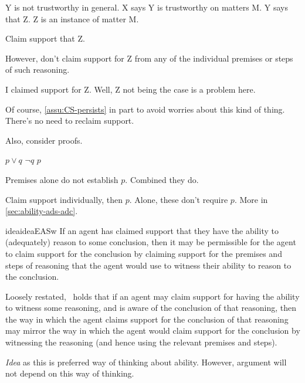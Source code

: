 \begin{note}
  Y is not trustworthy in general.
  X says Y is trustworthy on matters M.
  Y says that Z.
  Z is an instance of matter M.

  Claim support that Z.

  However, don't claim support for Z from any of the individual premises or steps of such reasoning.

  I claimed support for Z.
  Well, Z not being the case is a problem here.

  Of course, \ref{assu:CS-persists} in part to avoid worries about this kind of thing.
  There's no need to reclaim support.

  Also, consider proofs.

  \(p \lor q\)
  \(\lnot q\)
  \(p\)

  Premises alone do not establish \(p\).
  Combined they do.

  Claim support individually, then \(p\).
  Alone, these don't require \(p\).
  More in \autoref{sec:ability-ads-adc}.
\end{note}

\begin{note}[\EASw{}]
    \begin{restatable}[\EASw{-} --- \EASw{}]{idea}{ideaEASw}\label{prop:EASw}
    If an agent has claimed support that they have the ability to (adequately) reason to some conclusion, then it may be permissible for the agent to claim support for the conclusion by claiming support for the premises and steps of reasoning that the agent would use to witness their ability to reason to the conclusion.
  \end{restatable}

  Loosely restated,~\EASw{} holds that if an agent may claim support for having the ability to witness some reasoning, and is aware of the conclusion of that reasoning, then the way in which the agent claims support for the conclusion of that reasoning may mirror the way in which the agent would claim support for the conclusion by witnessing the reasoning (and hence using the relevant premises and steps).
\end{note}

\begin{note}
  \emph{Idea} as this is preferred way of thinking about ability.
  However, argument will not depend on this way of thinking.
\end{note}

